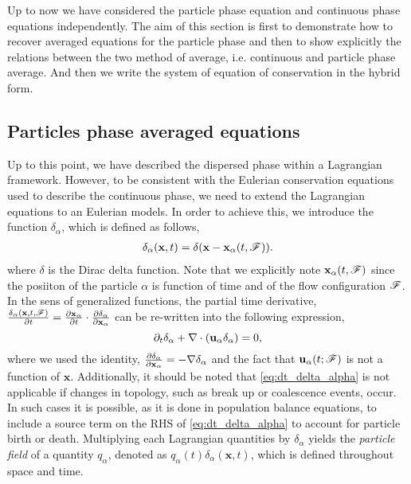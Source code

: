 Up to now we have considered the particle phase equation and continuous phase equations independently. 
The aim of this section is first to demonstrate how to recover averaged equations for the particle phase and then to show explicitly the relations between the two method of average, i.e. continuous and particle phase average.
And then we write the system of equation of conservation in the hybrid form. 

\subsection{Particles phase averaged equations}

Up to this point, we have described the dispersed phase within a Lagrangian framework.
However, to be consistent with the Eulerian conservation equations used to describe the continuous phase, we need to extend the Lagrangian equations to an Eulerian models. 
In order to achieve this, we introduce the function $\delta_\alpha$, which is defined as follows, 
\begin{align}
    \delta_\alpha(\textbf{x},t) = \delta(\textbf{x}-\textbf{x}_\alpha(t,\mathscr{F})).
    \label{eq:delta_alpha}
\end{align}
where $\delta$ is the Dirac delta function.
Note that we explicitly note $\textbf{x}_\alpha(t,\mathscr{F})$ since the posiiton of the particle $\alpha$ is function of time and of the flow configuration $\mathscr{F}$.
In the sens of generalized functions, the partial time derivative, $\frac{\delta_\alpha(\textbf{x},t,\mathscr{F})}{\partial t} =  \frac{\partial \textbf{x}_\alpha}{\partial t} \cdot \frac{\partial \delta_\alpha}{\partial \textbf{x}_\alpha} $ can be re-written into the following expression, 
\begin{equation}
    \partial_t \delta_\alpha
    + \mathbf{\nabla}\cdot (\textbf{u}_\alpha  \delta_\alpha)
    =0,
    \label{eq:dt_delta_alpha}
\end{equation}
where we used the identity, $\frac{\partial \delta_\alpha}{\partial \textbf{x}_\alpha}  = -\mathbf{\nabla} \delta_\alpha$ and the fact that $\textbf{u}_\alpha(t;\mathscr{F})$ is not a function of $\textbf{x}$. 
Additionally, it should be noted that \ref{eq:dt_delta_alpha} is not applicable if changes in topology, such as break up or coalescence events, occur.
In such cases it is possible, as it is done in population balance equations, to include a source term on the RHS of \ref{eq:dt_delta_alpha} to account for particle birth or death. 
Multiplying each Lagrangian quantities by $\delta_\alpha$ yields the \textit{particle field} of a quantity $q_\alpha$, denoted as $q_\alpha(t)\delta_\alpha(\textbf{x},t)$, which is defined throughout space and time.
